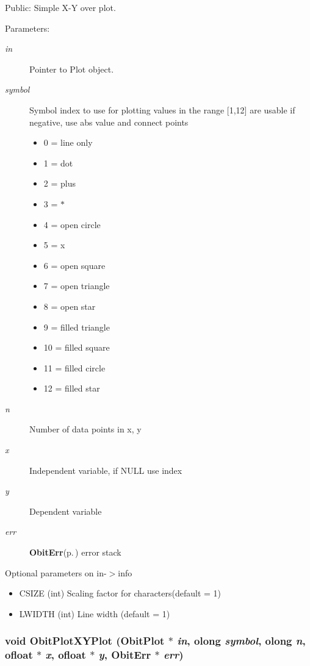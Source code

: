 Public: Simple X-Y over plot. 

\begin{Desc}
\item[Parameters:]
\begin{description}
\item[{\em in}]Pointer to Plot object. \item[{\em symbol}]Symbol index to use for plotting values in the range [1,12] are usable if negative, use abs value and connect points \begin{itemize}
\item 0 = line only \item 1 = dot \item 2 = plus \item 3 = $\ast$ \item 4 = open circle \item 5 = x \item 6 = open square \item 7 = open triangle \item 8 = open star \item 9 = filled triangle \item 10 = filled square \item 11 = filled circle \item 12 = filled star\end{itemize}
\item[{\em n}]Number of data points in x, y \item[{\em x}]Independent variable, if NULL use index \item[{\em y}]Dependent variable \item[{\em err}]{\bf Obit\-Err}{\rm (p.\,\pageref{structObitErr})} error stack\end{description}
\end{Desc}
Optional parameters on in-$>$info \begin{itemize}
\item CSIZE (int) Scaling factor for characters(default = 1) \item LWIDTH (int) Line width (default = 1) \end{itemize}
\subsubsection{\setlength{\rightskip}{0pt plus 5cm}void Obit\-Plot\-XYPlot ({\bf Obit\-Plot} $\ast$ {\em in}, {\bf olong} {\em symbol}, {\bf olong} {\em n}, {\bf ofloat} $\ast$ {\em x}, {\bf ofloat} $\ast$ {\em y}, {\bf Obit\-Err} $\ast$ {\em err})}\label{ObitPlot_8h_a9}


